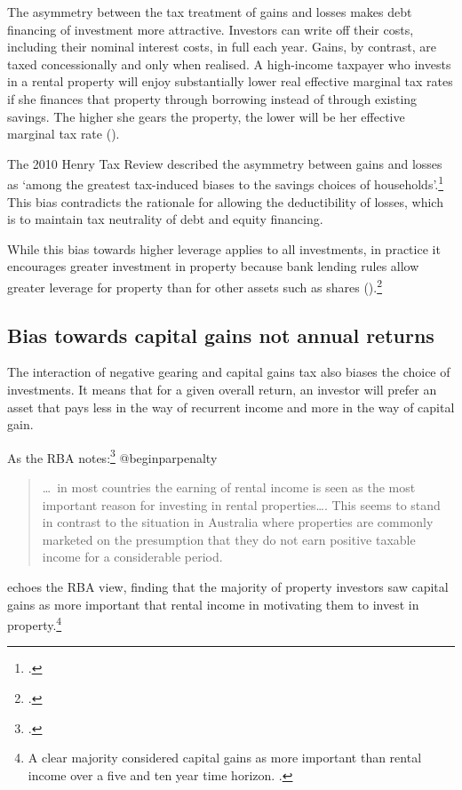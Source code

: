 The asymmetry between the tax treatment of gains and losses makes debt financing of investment more attractive. Investors can write off their costs, including their nominal interest costs, in full each year. 
Gains, by contrast, are taxed concessionally and only when realised. 
A high-income taxpayer who invests in a rental property will enjoy substantially lower real effective marginal tax rates if she finances that property through borrowing instead of through existing savings. The higher she gears the property, the lower will be her effective marginal tax rate (). 

The 2010 Henry Tax Review described the asymmetry between gains and losses as ‘among the greatest tax-induced biases to the savings choices of households’.\footcite[][69]{HenryTaxReview2010} This bias contradicts the rationale for allowing the deductibility of losses, which is to maintain tax neutrality of debt and equity financing.

While this bias towards higher leverage applies to all investments, in practice it encourages greater investment in property because bank lending rules allow greater leverage for property than for other assets such as shares ().\footcite[][23]{RBA2015SubmissionHomeOwnershipInquiry}  


\subsection{Bias towards capital gains not annual returns}
The interaction of negative gearing and capital gains tax also biases the choice of investments. It means that for a given overall return, an investor will prefer an asset that pays less in the way of recurrent income and more in the way of capital gain.

As the RBA notes:\footcite[][42]{RBA2014SubmissionAffordableHousingInquiry}
\csname @beginparpenalty
\begin{quote}
\dots\ in most countries the earning of rental income is seen as the most important reason for investing in rental properties\dots. This seems to stand in contrast to the situation in Australia where properties are commonly marketed on the presumption that they do not earn positive taxable income for a considerable period.
\end{quote}

\textcite{seelig2009understanding} echoes the RBA view, finding that the majority of property investors saw capital gains as more important that rental income in motivating them to invest in property.\footnote{A clear majority considered capital gains as more important than rental income over a five and ten year time horizon. \textcite[][63]{seelig2009understanding}.}

